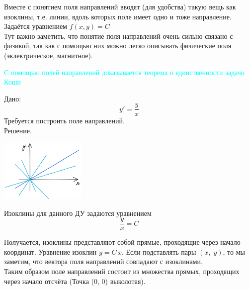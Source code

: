 \begin{figure}[h!]
    \noindent{}
\end{figure}

Вместе с понятием поля направлений вводят (для удобства) такую вещь как изоклины, т.е. линии, вдоль которых поле имеет одно и тоже направление. Задаётся уравнением $f(x, y) = C$\\

Тут важно заметить, что понятие поля направлений очень сильно связано с физикой, так как с помощью них можно легко описывать физические поля (эклектрическое, магнитное).

\textcolor{cyan}{С помощью полей направлений доказывается теорема о единственности задачи Коши}

\begin{Example}
    Дано: 
    \[
        y' = \frac{y}{x}
    \]
    Требуется построить поле направлений.\\
    Решение.\\
    \begin{floatingfigure}[2]{40mm}
        \noindent
        \hfil
        \includegraphics[height=30mm]{2_1_4.png}
        \hfil
    \end{floatingfigure}
    Изоклины для данного ДУ задаются уравнением 
    \[
        \frac{y}{x} = C
    \]
    
    Получается, изоклины представляют собой прямые, проходящие через начало координат. Уравнение изоклин $y = C\,x$. Если подставлять пары $(x,\; y)$, то мы заметим, что вектора поля направлений совпадают с изоклинами.\\
    Таким образом поле направлений состоит из множества прямых, проходящих через начало отсчёта (Точка (0, 0) выколотая).
\end{Example}

